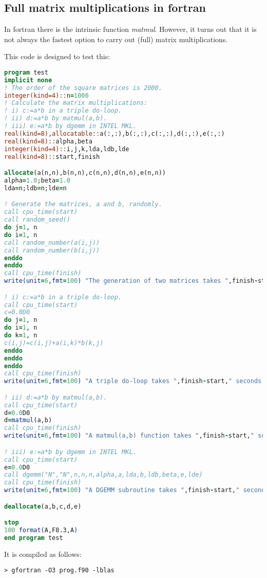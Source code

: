 
\subsection{Full matrix multiplications in fortran}

In fortran there is the intrinsic function {\sl matmul}. However, it turns out that 
it is not always the fastest option to carry out (full) matrix multiplications.

This code is designed to test this:

\begin{lstlisting}[language=Fortran]
program test
implicit none
! The order of the square matrices is 2000.
integer(kind=4)::n=1000
! Calculate the matrix multiplications:
! i) c:=a*b in a triple do-loop.
! ii) d:=a*b by matmul(a,b).
! iii) e:=a*b by dgemm in INTEL MKL.
real(kind=8),allocatable::a(:,:),b(:,:),c(:,:),d(:,:),e(:,:)
real(kind=8)::alpha,beta
integer(kind=4)::i,j,k,lda,ldb,lde
real(kind=8)::start,finish

allocate(a(n,n),b(n,n),c(n,n),d(n,n),e(n,n))
alpha=1.0;beta=1.0
lda=n;ldb=n;lde=n

! Generate the matrices, a and b, randomly.
call cpu_time(start)
call random_seed()
do j=1, n
do i=1, n
call random_number(a(i,j))
call random_number(b(i,j))
enddo
enddo
call cpu_time(finish)
write(unit=6,fmt=100) "The generation of two matrices takes ",finish-start," seconds."

! i) c:=a*b in a triple do-loop.
call cpu_time(start)
c=0.0D0
do j=1, n
do i=1, n
do k=1, n
c(i,j)=c(i,j)+a(i,k)*b(k,j)
enddo
enddo
enddo
call cpu_time(finish)
write(unit=6,fmt=100) "A triple do-loop takes ",finish-start," seconds."

! ii) d:=a*b by matmul(a,b).
call cpu_time(start)
d=0.0D0
d=matmul(a,b)
call cpu_time(finish)
write(unit=6,fmt=100) "A matmul(a,b) function takes ",finish-start," seconds."

! iii) e:=a*b by dgemm in INTEL MKL.
call cpu_time(start)
e=0.0D0
call dgemm("N","N",n,n,n,alpha,a,lda,b,ldb,beta,e,lde)
call cpu_time(finish)
write(unit=6,fmt=100) "A DGEMM subroutine takes ",finish-start," seconds."

deallocate(a,b,c,d,e)

stop
100 format(A,F8.3,A)
end program test
\end{lstlisting}

It is compiled as follows:
\begin{verbatim}
> gfortran -O3 prog.f90 -lblas
\end{verbatim}

